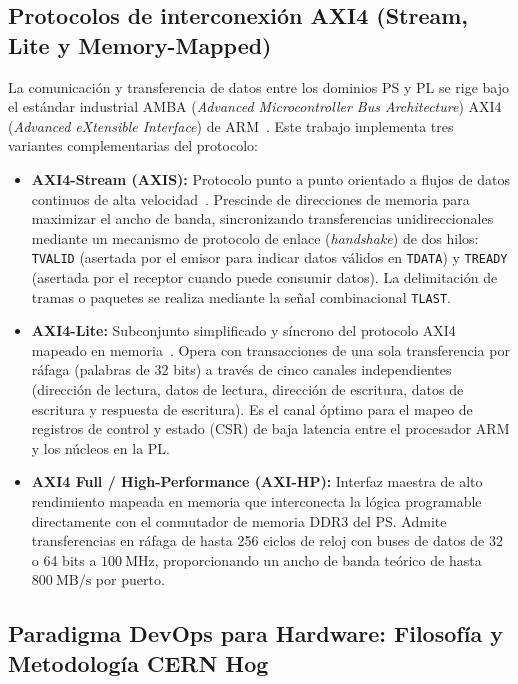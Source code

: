 \documentclass[standalone]{subfiles}
\begin{document}
\subsection{Protocolos de interconexión AXI4 (Stream, Lite y Memory-Mapped)}
\label{subsec:teoria_axi4}

La comunicación y transferencia de datos entre los dominios PS y PL se rige bajo el estándar industrial AMBA (\textit{Advanced Microcontroller Bus Architecture}) AXI4 (\textit{Advanced eXtensible Interface}) de ARM~\cite{arm_axi4_spec, arm_axis_spec}. Este trabajo implementa tres variantes complementarias del protocolo:

\begin{itemize}
    \item \textbf{AXI4-Stream (AXIS):} Protocolo punto a punto orientado a flujos de datos continuos de alta velocidad~\cite{arm_axis_spec}. Prescinde de direcciones de memoria para maximizar el ancho de banda, sincronizando transferencias unidireccionales mediante un mecanismo de protocolo de enlace (\textit{handshake}) de dos hilos: \texttt{TVALID} (asertada por el emisor para indicar datos válidos en \texttt{TDATA}) y \texttt{TREADY} (asertada por el receptor cuando puede consumir datos). La delimitación de tramas o paquetes se realiza mediante la señal combinacional \texttt{TLAST}.
    
    \item \textbf{AXI4-Lite:} Subconjunto simplificado y síncrono del protocolo AXI4 mapeado en memoria~\cite{arm_axi4_spec}. Opera con transacciones de una sola transferencia por ráfaga (palabras de 32 bits) a través de cinco canales independientes (dirección de lectura, datos de lectura, dirección de escritura, datos de escritura y respuesta de escritura). Es el canal óptimo para el mapeo de registros de control y estado (CSR) de baja latencia entre el procesador ARM y los núcleos en la PL.
    
    \item \textbf{AXI4 Full / High-Performance (AXI-HP):} Interfaz maestra de alto rendimiento mapeada en memoria que interconecta la lógica programable directamente con el conmutador de memoria DDR3 del PS. Admite transferencias en ráfaga de hasta 256 ciclos de reloj con buses de datos de 32 o 64 bits a $100~\text{MHz}$, proporcionando un ancho de banda teórico de hasta $800~\text{MB/s}$ por puerto.
\end{itemize}

\subsection{Paradigma DevOps para Hardware: Filosofía y Metodología CERN Hog}
\label{subsec:teoria_cern_hog}
\end{document}
